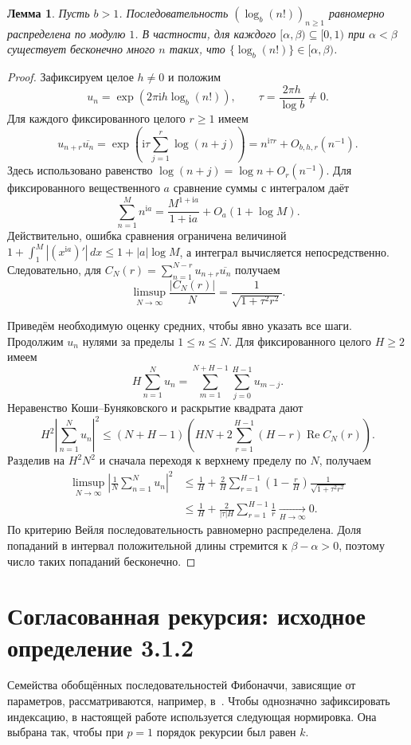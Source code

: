 \documentclass[12pt,a4paper]{article}
\newtheorem{lemma}{Лемма}[section]
\begin{document}
\begin{lemma}\label{lem:logfact}
Пусть $b>1$. Последовательность $(\log_b(n!))_{n\ge1}$
равномерно распределена по модулю $1$. В частности, для каждого
$[\alpha,\beta)\subseteq[0,1)$ при $\alpha<\beta$ существует
бесконечно много $n$ таких, что
$\{\log_b(n!)\}\in[\alpha,\beta)$.
\end{lemma}
\begin{proof}
Зафиксируем целое $h\ne0$ и положим
\[
 u_n=\exp(2\pi\mathrm i h\log_b(n!)),\qquad
 \tau=\frac{2\pi h}{\log b}\ne0.
\]
Для каждого фиксированного целого $r\ge1$ имеем
\[
 u_{n+r}\overline{u_n}
 =\exp\left(\mathrm i\tau\sum_{j=1}^r\log(n+j)\right)
 =n^{\mathrm i\tau r}+O_{b,h,r}(n^{-1}).
\]
Здесь использовано равенство
$\log(n+j)=\log n+O_r(n^{-1})$.
Для фиксированного вещественного $a$ сравнение суммы с интегралом даёт
\[
 \sum_{n=1}^M n^{\mathrm i a}
 =\frac{M^{1+\mathrm i a}}{1+\mathrm i a}+O_a(1+\log M).
\]
Действительно, ошибка сравнения ограничена величиной
$1+\int_1^M |(x^{\mathrm i a})'|\,dx
\le1+|a|\log M$, а интеграл вычисляется непосредственно.
Следовательно, для
$C_N(r)=\sum_{n=1}^{N-r}u_{n+r}\overline{u_n}$ получаем
\[
 \limsup_{N\to\infty}\frac{|C_N(r)|}{N}
 =\frac1{\sqrt{1+\tau^2r^2}}.
\]

Приведём необходимую оценку средних, чтобы явно указать все шаги.
Продолжим $u_n$ нулями за пределы $1\le n\le N$.
Для фиксированного целого $H\ge2$ имеем
\[
 H\sum_{n=1}^N u_n
 =\sum_{m=1}^{N+H-1}\sum_{j=0}^{H-1}u_{m-j}.
\]
Неравенство Коши--Буняковского и раскрытие квадрата дают
\[
 H^2\left|\sum_{n=1}^N u_n\right|^2
 \le (N+H-1)\left(
 HN+2\sum_{r=1}^{H-1}(H-r)\operatorname{Re}C_N(r)\right).
\]
Разделив на $H^2N^2$ и сначала переходя к верхнему пределу по $N$,
получаем
\[
\begin{aligned}
 \limsup_{N\to\infty}
 \left|\frac1N\sum_{n=1}^N u_n\right|^2
 &\le \frac1H+
 \frac2H\sum_{r=1}^{H-1}
 \left(1-\frac rH\right)\frac1{\sqrt{1+\tau^2r^2}}\\
 &\le \frac1H+\frac{2}{|\tau|H}\sum_{r=1}^{H-1}\frac1r
 \xrightarrow[H\to\infty]{}0.
\end{aligned}
\]
По критерию Вейля последовательность равномерно распределена.
Доля попаданий в интервал положительной длины стремится к
$\beta-\alpha>0$, поэтому число таких попаданий бесконечно.
\end{proof}
\section{Согласованная рекурсия: исходное определение 3.1.2}
Семейства обобщённых последовательностей Фибоначчи, зависящие
от параметров, рассматриваются, например, в~\cite{Mehraban2006Gulliver}.
Чтобы однозначно зафиксировать индексацию, в настоящей работе
используется следующая нормировка. Она выбрана так, чтобы при $p=1$
порядок рекурсии был равен $k$.
\end{document}
